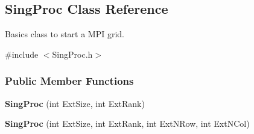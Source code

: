 \hypertarget{classSingProc}{\subsection{\-Sing\-Proc \-Class \-Reference}
\label{classSingProc}
}


\-Basics class to start a \-M\-P\-I grid.  




{\ttfamily \#include $<$\-Sing\-Proc.\-h$>$}

\subsubsection*{\-Public \-Member \-Functions}
\begin{DoxyCompactItemize}
\item 
\hypertarget{classSingProc_a41b0fe4066dfd42b65fc6f14ef94aac0}{{\bfseries \-Sing\-Proc} (int \-Ext\-Size, int \-Ext\-Rank)}\label{classSingProc_a41b0fe4066dfd42b65fc6f14ef94aac0}

\item 
\hypertarget{classSingProc_a402d8b08f74011e92861be136eba3f1e}{{\bfseries \-Sing\-Proc} (int \-Ext\-Size, int \-Ext\-Rank, int \-Ext\-N\-Row, int \-Ext\-N\-Col)}\label{classSingProc_a402d8b08f74011e92861be136eba3f1e}

\end{DoxyCompactItemize}
